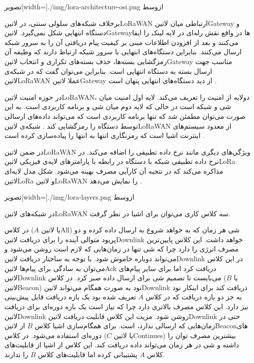 ‌تصویر[width=\textwidth]{./img/lora-architecture-osi.png}
‌ازوسط

برخلاف شبکه‌های سلولی سنتی، در ‌لاتین{LoRaWAN} ارتباطی میان ‌لاتین{Gateway} و دستگاه انتهایی شکل نمی‌گیرد.
‌لاتین{Gateway}ها در واقع نقش رله‌ای در لایه لینک را ایفا می‌کنند و بعد از افزودن اطلاعات مبنی بر کیفیت پیام دریافتی آن
را به سرور شبکه ارسال می‌کنند. بنابراین دستگاه‌های انتهایی با سرور شبکه ارتباط دارند که وظیفه آن رمزگشایی بسته‌ها، حذف بسته‌های تکراری و
انتخاب ‌لاتین{Gateway} مناسب جهت ارسال بسته به دستگاه انتهایی است.
بنابراین می‌توان گفت که در شبکه‌ی ‌لاتین{LoRaWAN} عملا ‌لاتین{Gateway} از دید دستگاه‌های انتهایی پنهان است
.

در حوزه امنیت ‌لاتین{LoRaWAN}، دولایه از امنیت را تعریف می‌کند. لایه اول امنیت میان شی و شبکه است در حالی که لایه دوم میان شی و برنامه کاربردی است.
به این صورت می‌توان مطمئن شد که تنها برنامه کاربردی است که می‌تواند داده‌های ارسالی توسط دستگاه را رمزگشایی کند
. شبکه‌ی ‌لاتین{LoRaWAN} از معدود سیستم‌های اینترنت اشیا است که رمزنگاری انتها به انتها را پیاده‌سازی کرده است
.

در ضمن ‌لاتین{LoRaWAN} ویژگی‌های دیگری مانند نرخ داده تطبیقی را اضافه می‌کند. در نرخ داده تطبیقی شبکه با دستگاه در رابطه با پارامترهای لایه‌ی فیزیکی ‌لاتین{LoRa} مذاکره می‌کند
که در نتجیه آن کارآیی مصرف بهینه می‌شود. شکل  مدل لایه‌ای ‌لاتین{LoRa} و ‌لاتین{LoRaWAN} را نمایش می‌دهد
.

‌تصویر[width=\textwidth]{./img/lora-layers.png}
‌ازوسط

در شبکه‌های ‌لاتین{LoRaWAN} سه کلاس کاری می‌توان برای اشیا در نظر گرفت.

 در کلاس ($A$ یا ‌لاتین{All}) شی هر زمان که به خواهد شروع به ارسال داده کرده و دو پریود متوالی آینده را برای دریافت ‌لاتین{Downlink} خواهد داشت. این کلاس پایین‌ترین مصرف انرژی را دارد چرا که شی تنها در زمان‌هایی که لازم است
روشن می‌شود و می‌تواند دوباره خاموش شود. با توجه به ساختار دریافت ‌لاتین{Downlink} در این کلاس می‌توان به سادگی برای پیام‌ها ‌لاتین{Ack} دریافت کرد اما برای سایر پیام‌های ‌لاتین{Downlink} می‌بایست تا تصمیم شی برای ارسال داده صبر کرد.
 در کلاس ($B$ یا ‌لاتین{Beacon}) نود به صورت همگام می‌تواند ‌لاتین{Downlink} دریافت کند برای اینکار نود به جز دو بازه دریافت که در کلاس $A$ تعریف شده بود یک بازه دریافت قابل پیش‌بینی نیز دارد.
این کلاس مصرف بالاتری دارد چرا که نیاز است یک بازه دوره‌ای برای دریافت ‌لاتین{Downlink} روشن شود. مزیت این کلاس قابلیت دریافت ‌لاتین{Downlink} حتی در زمان‌هایی که ارسالی ندارد، است. برای همگام‌سازی اشیا کلاس $B$ از ‌لاتین{Beacon}های دوره‌ای استفاده می‌شود.
 در کلاس ($C$ یا ‌لاتین{Continues}) بیشترین مصرف توان را داشته و شی در هر زمان می‌تواند داده دریافت کند. این کلاس از اشیا از قابلیت‌های کلاس $A$ پشتیبانی کرده اما قابلیت‌های کلاس $B$ را ندارند.

